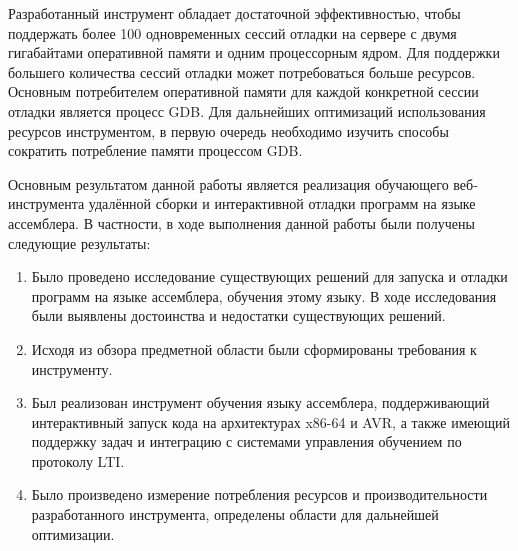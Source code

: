 \documentclass[a4paper,article,14pt]{extarticle}
\begin{document}
Разработанный инструмент обладает достаточной эффективностью, чтобы поддержать более 100 одновременных сессий отладки на сервере с двумя гигабайтами оперативной памяти и одним процессорным ядром. Для поддержки большего количества сессий отладки может потребоваться больше ресурсов. Основным потребителем оперативной памяти для каждой конкретной сессии отладки является процесс GDB. Для дальнейших оптимизаций использования ресурсов инструментом, в первую очередь необходимо изучить способы сократить потребление памяти процессом GDB.

\pagebreak
{}

Основным результатом данной работы является реализация обучающего веб-инструмента удалённой сборки и интерактивной отладки программ на языке ассемблера. В частности, в ходе выполнения данной работы были получены следующие результаты:

\begin{enumerate}
    \item Было проведено исследование существующих решений для запуска и отладки программ на языке ассемблера, обучения этому языку. В ходе исследования были выявлены достоинства и недостатки существующих решений.
    \item Исходя из обзора предметной области были сформированы требования к инструменту.
    \item Был реализован инструмент обучения языку ассемблера, поддерживающий интерактивный запуск кода на архитектурах x86-64 и AVR, а также имеющий поддержку задач и интеграцию с системами управления обучением по протоколу LTI.
    \item Было произведено измерение потребления ресурсов и производительности разработанного инструмента, определены области для дальнейшей оптимизации.
\end{enumerate}

\pagebreak
\begin{thebibliography}{1}
\printbibliography[heading=none]
\end{thebibliography}
\end{document}
